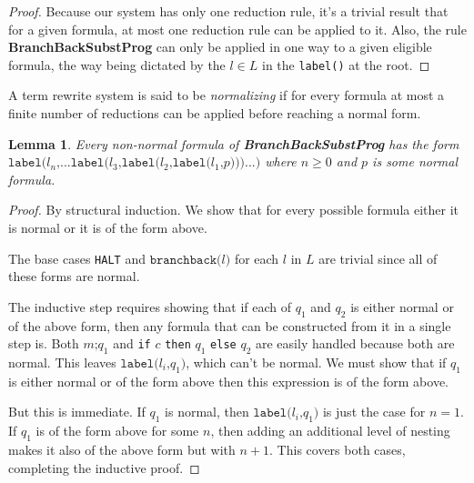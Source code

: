 \documentclass[11pt]{article}
\begin{document}
\begin{proof}
Because our system has only one reduction rule, it's a trivial result that for a given formula, at most one reduction rule can be applied to it.  Also, the rule \textbf{BranchBackSubstProg} can only be applied in one way to a given eligible formula, the way being dictated by the $l \in L$ in the \texttt{label()} at the root.
\end{proof}

A term rewrite system is said to be \emph{normalizing} if for every formula at most a finite number of reductions can be applied before reaching a normal form.

\begin{comment}

\newtheorem*{labelsfinite}{Lemma}
\begin{labelsfinite}
The number of labels in a program formula is finite.
\end{labelsfinite}

\begin{proof}
Trivial from either structural induction, or just the property of formulas being finite.
\end{proof}

\end{comment}

\newtheorem*{formofnonnormalbbsp}{Lemma}
\begin{formofnonnormalbbsp}
Every non-normal formula of \textbf{BranchBackSubstProg} has the form $\texttt{label(}l_{n}\texttt{,} ... \texttt{label(}l_{3}\texttt{,} \texttt{label(}l_{2}\texttt{,} \texttt{label(}l_{1}\texttt{,} p\texttt{)}\texttt{)}\texttt{)} ... \texttt{)}$ where $n \geq 0$ and $p$ is some normal formula.
\end{formofnonnormalbbsp}

\begin{proof}
By structural induction.  We show that for every possible formula either it is normal or it is of the form above.

The base cases \texttt{HALT} and $\texttt{branchback(}l\texttt{)}$ for each $l$ in $L$ are trivial since all of these forms are normal.

The inductive step requires showing that if each of $q_{1}$ and $q_{2}$ is either normal or of the above form, then any formula that can be constructed from it in a single step is.  Both $m\texttt{;}q_{1}$ and \texttt{if} $c$ \texttt{then} $q_{1}$ \texttt{else} $q_{2}$ are easily handled because both are normal.  This leaves $\texttt{label(}l_{i}\texttt{,} q_{1}\texttt{)}$, which can't be normal.  We must show that if $q_{1}$ is either normal or of the form above then this expression is of the form above.

But this is immediate.  If $q_{1}$ is normal, then $\texttt{label(}l_{i}\texttt{,} q_{1}\texttt{)}$ is just the case for $n = 1$.  If $q_{1}$ is of the form above for some $n$, then adding an additional level of nesting makes it also of the above form but with $n + 1$.  This covers both cases, completing the inductive proof.
\end{proof}
\end{document}

